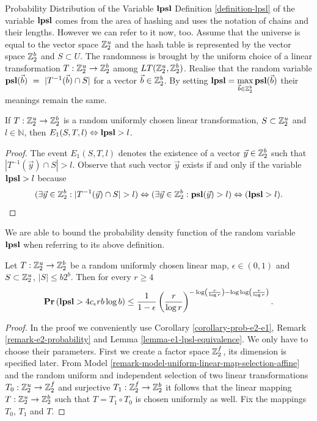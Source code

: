 \begin{section}{Probability Distribution of the Variable \texorpdfstring{$\mathbf{lpsl}$}{lpsl}}
Definition \ref{definition-lpsl} of the variable $\mathbf{lpsl}$ comes from the area of hashing and uses the notation of chains and their lengths. However we can refer to it now, too. Assume that the universe is equal to the vector space $\mathbb{Z}_{2}^{u}$ and the hash table is represented by the vector space $\mathbb{Z}_{2}^{b}$ and $S \subset U$. The randomness is brought by the uniform choice of a linear transformation $T: \mathbb{Z}_{2}^{u} \rightarrow \mathbb{Z}_{2}^{b}$ among $LT(\mathbb{Z}_{2}^{u}, \mathbb{Z}_{2}^{b})$. Realise that the random variable $\mathbf{psl}(\vec{b})~=~|T^{-1}(\vec{b}) \cap S|$ for a vector $\vec{b} \in \mathbb{Z}_{2}^{b}$. By setting $\mathbf{lpsl} = \displaystyle\max_{\vec{b} \in \mathbb{Z}_{2}^{b}} \mathbf{psl}(\vec{b})$ their meanings remain the same. 

\begin{lemma}
\label{lemma-e1-lpsl-equivalence}
If $T: \mathbb{Z}_{2}^{u} \rightarrow \mathbb{Z}_{2}^{b}$ is a random uniformly chosen linear transformation, $S \subset \mathbb{Z}_{2}^{u}$ and $l \in \mathbb{N}$, then $E_1(S, T, l) \Leftrightarrow \mathbf{lpsl} > l$.
\end{lemma}
\begin{proof}
The event $E_1(S, T, l)$ denotes the existence of a vector $\vec{y} \in \mathbb{Z}_{2}^{b}$ such that $|T^{-1}(\vec{y}) \cap S| > l$. Observe that such vector $\vec{y}$ exists if and only if the variable $\mathbf{lpsl} > l$ because
\[
(\exists \vec{y} \in \mathbb{Z}_{2}^{b}: |T^{-1}(\vec{y}) \cap S| > l) \Leftrightarrow (\exists \vec{y} \in \mathbb{Z}_{2}^{b}: \mathbf{psl}(\vec{y}) > l) \Leftrightarrow (\mathbf{lpsl} > l) \text{.}
\] 
\end{proof}

We are able to bound the probability density function of the random variable $\mathbf{lpsl}$ when referring to its above definition.
\begin{remark}
\label{remark-probability-long-chain}
Let $T: \mathbb{Z}_{2}^{u} \rightarrow \mathbb{Z}_{2}^{b}$ be a random uniformly chosen linear map, $\epsilon \in (0, 1)$ and $S \subset \mathbb{Z}_{2}^{u}$, $|S| \leq b 2 ^ b$. Then for every $r \geq 4$
\[
	\mathbf{Pr}\left(\mathbf{lpsl} > 4 c_\epsilon r b \log b\right) \leq \frac{1}{1 - \epsilon} \left(\frac{r}{\log r}\right)^{-\log \left(\frac{r}{\log r}\right) - \log \log \left(\frac{r}{\log r}\right)} \text{.}
\]
\end{remark}
\begin{proof}
In the proof we conveniently use Corollary \ref{corollary-prob-e2-e1}, Remark \ref{remark-e2-probability} and Lemma \ref{lemma-e1-lpsl-equivalence}. We only have to choose their parameters. First we create a factor space $\mathbb{Z}_{2}^{f}$, its dimension is specified later. From Model \ref{remark-model-uniform-linear-map-selection-affine} and the random uniform and independent selection of two linear transformations $T_0: \mathbb{Z}_{2}^{u} \rightarrow \mathbb{Z}_{2}^{f}$ and surjective $T_1: \mathbb{Z}_{2}^{f} \rightarrow \mathbb{Z}_{2}^{b}$ it follows that the linear mapping $T: \mathbb{Z}_{2}^{u} \rightarrow \mathbb{Z}_{2}^{b}$ such that $T = T_1 \circ T_0$ is chosen uniformly as well. Fix the mappings $T_0$, $T_1$ and $T$.


\end{proof}
\end{section}
